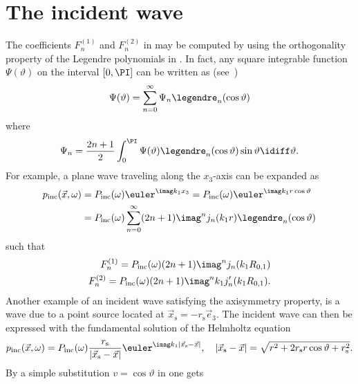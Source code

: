 \section{The incident wave}
\label{Sec1:incidentWave}
The coefficients $F_n^{(1)}$ and $F_n^{(2)}$ in  may be computed by using the orthogonality property of the Legendre polynomials in . In fact, any square integrable function $\Psi(\vartheta)$ on the interval $[0,\PI]$ can be written as (see~\cite[p. 27]{Ihlenburg1998fea})
\begin{equation}
	\Psi(\vartheta) = \sum_{n=0}^\infty \Psi_n \legendre_n(\cos\vartheta)
\end{equation}
where
\begin{equation}\label{Eq1:H_n}
	\Psi_n = \frac{2n+1}{2}\int_0^\PI \Psi(\vartheta) \legendre_n(\cos\vartheta)\sin\vartheta\idiff\vartheta.
\end{equation}
For example, a plane wave traveling along the $x_3$-axis can be expanded as~\cite[10.1.47]{Abramowitz1965hom}
\begin{equation}\label{Eq1:planeWave}
\begin{aligned}
	p_{\mathrm{inc}}(\vec{x},\omega) &= P_{\mathrm{inc}}(\omega)\euler^{\imag k_1 x_3} = P_{\mathrm{inc}}(\omega)\euler^{\imag k_1 r\cos\vartheta}\\
	&= P_{\mathrm{inc}}(\omega)\sum_{n=0}^\infty (2n+1)\imag^n j_n(k_1 r)\legendre_n(\cos\vartheta)
\end{aligned}
\end{equation}
such that
\begin{align}
	F_n^{(1)} = P_{\mathrm{inc}}(\omega) (2n+1)\imag^n j_n(k_1 R_{0,1})\\
	F_n^{(2)} = P_{\mathrm{inc}}(\omega) (2n+1)\imag^n k_1 j_n'(k_1 R_{0,1}).
\end{align}
Another example of an incident wave satisfying the axisymmetry property, is a wave due to a point source located at $\vec{x}_{\mathrm{s}} = -r_{\mathrm{s}}\vec{e}_3$. The incident wave can then be expressed with the fundamental solution of the Helmholtz equation
\begin{equation}
	p_{\mathrm{inc}}(\vec{x},\omega) = P_{\mathrm{inc}}(\omega)\frac{r_{\mathrm{s}}}{|\vec{x}_{\mathrm{s}}-\vec{x}|}\euler^{\imag k_1 |\vec{x}_{\mathrm{s}}-\vec{x}|},\quad |\vec{x}_{\mathrm{s}}-\vec{x}| = \sqrt{r^2+2r_{\mathrm{s}}r\cos\vartheta + r_{\mathrm{s}}^2}.
\end{equation}
By a simple substitution $v=\cos\vartheta$ in  one gets
